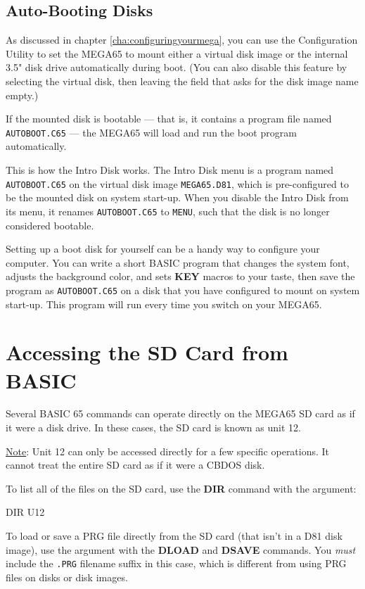 \subsection{Auto-Booting Disks}

As discussed in chapter \vref{cha:configuringyourmega}, you can use the Configuration Utility to set the MEGA65 to mount either a virtual disk image or the internal 3.5" disk drive automatically during boot. (You can also disable this feature by selecting the virtual disk, then leaving the field that asks for the disk image name empty.)

If the mounted disk is bootable --- that is, it contains a program file named {\tt AUTOBOOT.C65} --- the MEGA65 will load and run the boot program automatically.

This is how the Intro Disk works. The Intro Disk menu is a program named {\tt AUTOBOOT.C65} on the virtual disk image {\tt MEGA65.D81}, which is pre-configured to be the mounted disk on system start-up. When you disable the Intro Disk from its menu, it renames {\tt AUTOBOOT.C65} to {\tt MENU}, such that the disk is no longer considered bootable.

Setting up a boot disk for yourself can be a handy way to configure your computer. You can write a short BASIC program that changes the system font, adjusts the background color, and sets {\bf KEY} macros to your taste, then save the program as {\tt AUTOBOOT.C65} on a disk that you have configured to mount on system start-up. This program will run every time you switch on your MEGA65.


\section{Accessing the SD Card from BASIC}

Several BASIC 65 commands can operate directly on the MEGA65 SD card as if it were a disk drive. In these cases, the SD card is known as unit 12.

\underline{Note}: Unit 12 can only be accessed directly for a few specific operations. It cannot treat the entire SD card as if it were a CBDOS disk.

To list all of the files on the SD card, use the {\bf DIR} command with the  argument:

\begin{screenoutput}
DIR U12
\end{screenoutput}

To load or save a PRG file directly from the SD card (that isn't in a D81 disk image), use the  argument with the {\bf DLOAD} and {\bf DSAVE} commands. You {\em must} include the {\tt .PRG} filename suffix in this case, which is different from using PRG files on disks or disk images.

